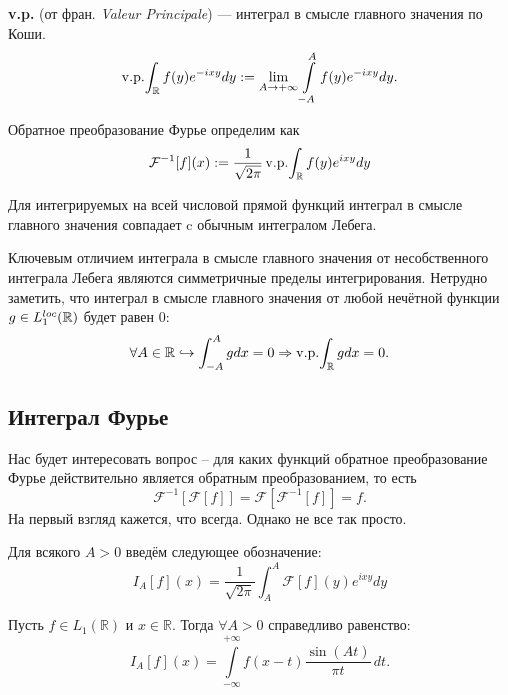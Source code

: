 \begin{note}
\textbf{v.p.} (от фран. \textit{Valeur Principale}) — интеграл в смысле главного значения по Коши.
\[
\mathop{\mathrm{v.p.}}\!\int_{\mathbb{R}} f(y) e^{-ixy}dy := \lim_{A \to +\infty} \int\limits_{-A}^{A} f(y)e^{-ixy}dy.
\]
\end{note}

\begin{definition}
    Обратное преобразование Фурье определим как
    \[
        \mathcal{F}^{-1}[f](x) := \dfrac{1}{\sqrt {2\pi}}\mathop{\mathrm{v.p.}}\!\int_{\mathbb{R}} f(y)e^{ixy}dy
    \]
\end{definition}

\begin{note}
    Для интегрируемых на всей числовой прямой функций интеграл в смысле главного значения совпадает c обычным интегралом Лебега.
\end{note}

\begin{note}
    Ключевым отличием интеграла в смысле главного значения от несобственного интеграла Лебега являются симметричные пределы интегрирования.
    Нетрудно заметить, что интеграл в смысле главного значения от любой нечётной функции $g \in L_1^{loc}(\mathbb{R})$ будет равен 0:
    \[
        \forall A \in \mathbb{R} \hookrightarrow \int_{-A}^{A} g dx = 0 \Rightarrow \mathop{\mathrm{v.p.}}\!\int_{\mathbb{R}} gdx = 0.
    \]
\end{note}
\subsection{Интеграл Фурье}
\begin{question}
Нас будет интересовать вопрос -- для каких функций обратное преобразование Фурье действительно является обратным преобразованием, то есть
\[
    \mathcal{F}^{-1}[\mathcal{F}[f]] = \mathcal{F}[\mathcal{F}^{-1}[f]] = f.
\]
На первый взгляд кажется, что всегда.
Однако не все так просто.
\end{question}
\begin{definition}
    Для всякого $A > 0$ введём следующее обозначение:
    \[
        I_A[f](x) = \dfrac{1}{\sqrt {2\pi}} \int_{A}^{A} \mathcal{F}[f](y)e^{ixy}dy
    \]
\end{definition}

\begin{lemma}[Ключевая]\label{lem:key}
Пусть $f \in L_1(\mathbb{R})$ и $x \in \mathbb{R}$. Тогда $\forall A > 0$ справедливо равенство:
\[
I_A \left[ f \right](x) = \int\limits_{-\infty}^{+\infty} f(x - t) \frac{\sin(At)}{\pi t} \, dt.
\]
\end{lemma}

